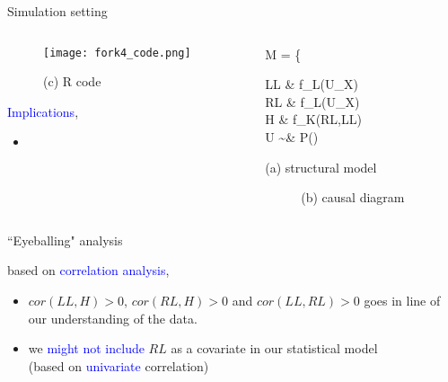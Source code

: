 \begin{frame}
	{Simulation setting}
	\begin{columns}
		\begin{column}{0.5\textwidth}
			\begin{figure}
				\texttt{[image: fork4\_code.png]}
				\caption*{(c) R code}
			\end{figure}
			\textcolor{blue}{Implications},
			\begin{itemize}
				\item {} \\
			\end{itemize}
		\end{column}
		\begin{column}{0.5\textwidth}  
			\begin{equ}
				M = \left\{ \begin{aligned} 
					LL \leftarrow & \; f_{L}(U_{X}) \\
					RL \leftarrow & \; f_{L}(U_{X}) \\
					H \leftarrow & \; f_{K}(RL,LL) \\
					U \sim & \; P()
				\end{aligned} \right
				\caption*{(a) structural model}
			\end{equ}
			\begin{figure}
				\caption*{(b) causal diagram}
			\end{figure}
		\end{column}
	\end{columns}
\end{frame}
%
%
\begin{lhframe}[rhgraphic={\texttt{[image: fork4\_panel.pdf]}}]
	{``Eyeballing" analysis}
	
	based on \textcolor{blue}{correlation analysis},
	\begin{itemize}
		\item $cor(LL, H)>0$, $cor(RL, H)>0$ and $cor(LL, RL)>0$ goes in line of our understanding of the data.
		\item we \textcolor{blue}{might not include} $RL$ as a covariate in our statistical model \\
		{\small (based on \textcolor{blue}{univariate} correlation)} 
	\end{itemize}
\end{lhframe}
